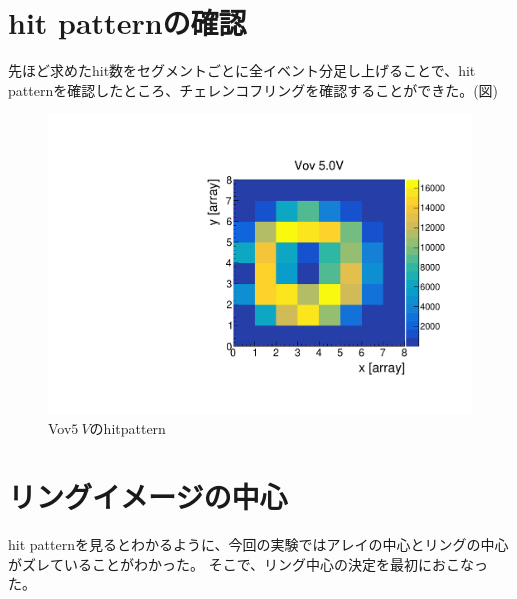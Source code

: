 \documentclass[uplatex, titlepage, dvipdfmx, 12pt, a4paper]{jsreport}
\begin{document}
  \section{hit patternの確認}
    先ほど求めたhit数をセグメントごとに全イベント分足し上げることで、hit patternを確認したところ、チェレンコフリングを確認することができた。(図)
    \begin{figure}[h]
      \begin{center} 
        \includegraphics[scale=0.5, clip]{image/hitpattern.pdf}
        \caption{Vov$\SI{5}{V}$のhitpattern} 
        \label{fig:hitpattern} 
      \end{center}
    \end{figure}

  \section{リングイメージの中心}
    hit patternを見るとわかるように、今回の実験ではアレイの中心とリングの中心がズレていることがわかった。
    そこで、リング中心の決定を最初におこなった。
\end{document}
